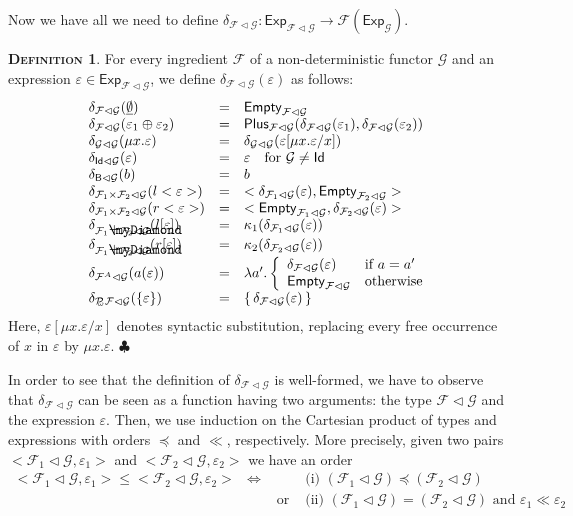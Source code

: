 \documentclass{LMCS}
\def\pow{{\mathcal P_{\!\!\!\omega}}}
\newcommand\E\varepsilon
\newcommand\Exp{\mathsf{Exp}}
\newcommand\Plus{\mathsf{Plus}}
\newcommand\Empty{\mathsf{Empty}}
\newcommand\id{\mathsf{Id}}
\newcommand\B{\mathsf{B}}
\newcommand\G{\mathcal{G}}
\newcommand\F{\mathcal{F}}
\newcommand\emp{\underline\emptyset}
\newcommand{\myplus}{\mathbin{\rlap{$\myDiamond$}\hspace*{.01cm}\raisebox{.14ex}{$+$}}}
\def\hyph{-\penalty0\hskip0pt\relax}
\theoremstyle{definition}
\newtheorem{mydefinition}{\textsc{Definition}}[section]
\theoremstyle{plain}
\theoremstyle{plain}
\theoremstyle{plain}
\theoremstyle{plain}
\theoremstyle{definition}
\theoremstyle{definition}
\newenvironment{definition}{
\begin{mydefinition}}
    {\hfill$\clubsuit$\end{mydefinition}}
\begin{document}
Now we have all we need to define $\delta_{\F \lhd \G}\colon
\Exp_{\F\lhd \G}\to \F(\Exp_\G)$.
\begin{definition}
For every ingredient $\F$ of a non\hyph deterministic functor
$\G$ and an expression $\E\in \Exp_{\F\lhd \G}$, we define $\delta_{\F\lhd
\G}(\E)$ as follows:
\[
\begin{array}{lcl}
\delta_{\F\lhd \G}  (\emp) &=& \Empty_{\F\lhd \G}\\
\delta_{\F\lhd \G}  (\E_1\oplus\E_2) &=& \Plus_{\F\lhd \G}(\delta_{\F\lhd
\G}  (\E_1), \delta_{\F\lhd \G}  (\E_2))\\
\delta_{\G\lhd \G}  (\mu x. \E) &=& \delta_{\G\lhd \G} (\E[\mu x.
\E/x])\\
\delta_{\id \lhd \G}(\E) &=& \E\ \ \ \textrm{for} \ \G\neq \id\\
\delta_{\B \lhd \G} (b) &=& b\\
\delta_{\F_1\times \F_2 \lhd \G} (l<\E>) &=& <
\delta_{\F_1\lhd \G}(\E), \Empty_{\F_2\lhd \G} >\\
\delta_{\F_1\times \F_2 \lhd \G} (r<\E>) &=& <\Empty_{\F_1\lhd \G},
\delta_{\F_2\lhd \G}(\E) >\\
\delta_{\F_1\myplus \F_2 \lhd \G} (l[\E]) &=& \kappa_1(\delta_{\F_1
\lhd \G}(\E))\\
\delta_{\F_1\myplus \F_2 \lhd \G} (r[\E]) &=& \kappa_2(\delta_{\F_2
\lhd \G}(\E))\\
\delta_{\F^A \lhd \G} (a(\E)) &=& \lambda a' .\left\{
\begin{array}{ll}\delta_{\F \lhd \G} (\E)
&\text{if }a=a'\\\Empty_{\F\lhd \G}&\text{otherwise}\end{array}\right.
\\
\delta_{\pow \F\lhd \G} (\{\E\}) &=& \{\,\delta_{\F
\lhd \G}(\E)\,\}
\end{array}
\]
Here, $\E[\mu x.\E/x]$ denotes syntactic substitution,
replacing every free occurrence of $x$  in $\E$ by $\mu x.\E$.
\end{definition}
In order to see that the definition of $\delta_{\F\lhd \G}$ is
well-formed, we have to observe that $\delta_{\F\lhd \G}$ can be seen
as a function having two arguments: the type $\F\lhd \G$ and the
expression $\E$. Then, we use induction on the Cartesian product of
types and expressions with orders $\preceq$ and $\ll$, respectively.
More precisely, given two pairs $<\F_1\lhd \G, \E_1>$ and  $<\F_2\lhd \G, \E_2>$ we have an order 
\begin{equation}\label{ind:order5}
\begin{array}{lcll}
<\F_1\lhd \G, \E_1> \leq <\F_2\lhd \G, \E_2> &\Leftrightarrow&&
\text{(i) } (\F_1\lhd \G) \preceq (\F_2\lhd \G) \\ &&\text{ or }&
\text{(ii) } (\F_1\lhd \G) = (\F_2\lhd \G)\text{ and } \E_1\ll \E_2
\end{array}
\end{equation}
\end{document}
